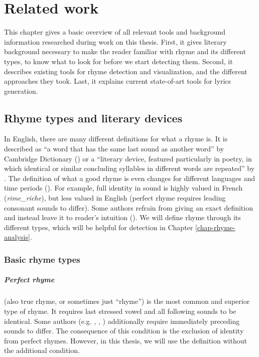 \chapter{Related work}\label{chap-related-work}
This chapter gives a basic overview of all relevant tools and background information researched during work on this thesis. First, it gives literary background necessary to make the reader familiar with rhyme and its different types, to know what to look for before we start detecting them. Second, it describes existing tools for rhyme detection and visualization, and the different approaches they took. Last, it explains current state-of-art tools for lyrics generation.


\section{Rhyme types and literary devices}

In English, there are many different definitions for what a rhyme is. It is described as ``a word that has the same last sound as another word'' by Cambridge Dictionary (\cite{walter2008cambridge}) or a ``literary device, featured particularly in poetry, in which identical or similar concluding syllables in different words are repeated'' by \cite{literarydevices2020}. The definition of what a good rhyme is even changes for different languages and time periods (\cite{zhirmunsky2013introduction}). For example, full identity in sound is highly valued in French (\textit{\gls{rime_riche}}), but less valued in English (perfect rhyme requires leading consonant sounds to differ). Some authors refrain from giving an exact definition and instead leave it to reader's intuition (\cite{plechavc2018collocation}). We will define rhyme through its different types, which will be helpful for detection in Chapter \ref{chap-rhyme-analysis}.

\subsection{Basic rhyme types}
\paragraph{Perfect rhyme} (also true rhyme, or sometimes just ``rhyme'') is the most common and superior type of rhyme. It requires last stressed vowel and all following sounds to be identical.
Some authors (e.g. \cite{bain1867manual}, \cite{vanphonological}, \cite{bergman2017litcharts}) additionally require immediately preceding sounds to differ. The consequence of this condition is the exclusion of identity from perfect rhymes. However, in this thesis, we will use the definition without the additional condition.

